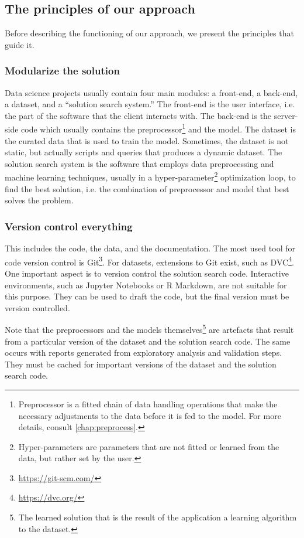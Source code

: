\subsection{The principles of our approach}

Before describing the functioning of our approach, we present the principles that guide it.

\subsubsection{Modularize the solution}

Data science projects usually contain four main modules: a front-end, a back-end, a
dataset, and a ``solution search system.''  The front-end is the user interface, i.e.
the part of the software that the client interacts with.  The back-end is the server-side
code which usually contains the preprocessor\footnote{Preprocessor is a fitted chain of
data handling operations that make the necessary adjustments to the data before it is
fed to the model.  For more details, consult \cref{chap:preprocess}.} and the model.
The dataset is the curated data that is used to train the
model.  Sometimes, the dataset is not static, but actually scripts and queries that
produces a dynamic dataset.  The solution search system is the software that employs data
preprocessing and machine learning techniques, usually in a
hyper-parameter\footnote{Hyper-parameters are parameters that are not fitted or learned
from the data, but rather set by the user.} optimization loop,
to find the best solution, i.e. the combination of preprocessor and model that best
solves the problem.

\subsubsection{Version control everything}

This includes the code, the data, and the
documentation. The most used tool for code version control is
Git\footnote{\url{https://git-scm.com/}}.  For datasets,
extensions to Git exist, such as DVC\footnote{\url{https://dvc.org/}}.  One important aspect
is to version control the solution search code.  Interactive environments, such as Jupyter
Notebooks or R Markdown, are not suitable for this purpose.  They can be used to draft the code, but
the final version must be version controlled.

Note that the preprocessors and the models themselves\footnote{The learned
solution that is the result of the application a learning algorithm to the dataset.} are
artefacts that result from a particular version of the dataset and the solution search
code.  The same occurs with reports generated from exploratory analysis and validation
steps.  They must be cached for important versions of the dataset and the solution search
code.

